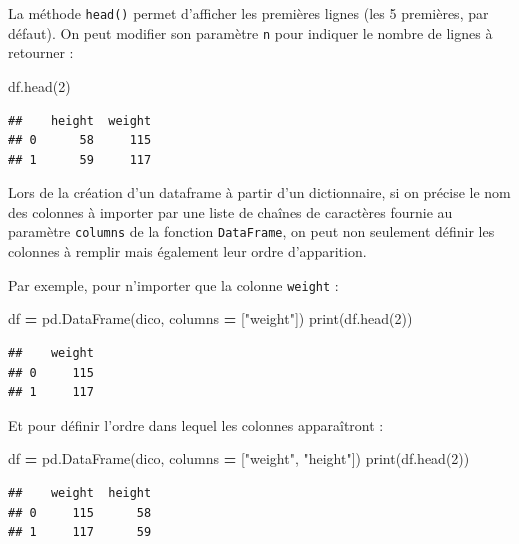 \documentclass[
  12pt,
]{book}
\newenvironment{Shaded}{\begin{snugshade}}{\end{snugshade}}
\newcommand{\BuiltInTok}[1]{#1}
\newcommand{\DecValTok}[1]{\textcolor[rgb]{0.00,0.00,0.81}{#1}}
\newcommand{\NormalTok}[1]{#1}
\newcommand{\OperatorTok}[1]{\textcolor[rgb]{0.81,0.36,0.00}{\textbf{#1}}}
\newcommand{\StringTok}[1]{\textcolor[rgb]{0.31,0.60,0.02}{#1}}
\numberwithin{equation}{section}
\numberwithin{countremarque}{section}
\begin{document}
La méthode \texttt{head()} permet d'afficher les premières lignes (les 5 premières, par défaut). On peut modifier son paramètre \texttt{n} pour indiquer le nombre de lignes à retourner :

\begin{Shaded}
\begin{Highlighting}[]
\NormalTok{df.head(}\DecValTok{2}\NormalTok{)}
\end{Highlighting}
\end{Shaded}

\begin{lstlisting}
##    height  weight
## 0      58     115
## 1      59     117
\end{lstlisting}

Lors de la création d'un dataframe à partir d'un dictionnaire, si on précise le nom des colonnes à importer par une liste de chaînes de caractères fournie au paramètre \texttt{columns} de la fonction \texttt{DataFrame}, on peut non seulement définir les colonnes à remplir mais également leur ordre d'apparition.

Par exemple, pour n'importer que la colonne \texttt{weight} :

\begin{Shaded}
\begin{Highlighting}[]
\NormalTok{df }\OperatorTok{=}\NormalTok{ pd.DataFrame(dico, columns }\OperatorTok{=}\NormalTok{ [}\StringTok{"weight"}\NormalTok{])}
\BuiltInTok{print}\NormalTok{(df.head(}\DecValTok{2}\NormalTok{))}
\end{Highlighting}
\end{Shaded}

\begin{lstlisting}
##    weight
## 0     115
## 1     117
\end{lstlisting}

Et pour définir l'ordre dans lequel les colonnes apparaîtront :

\begin{Shaded}
\begin{Highlighting}[]
\NormalTok{df }\OperatorTok{=}\NormalTok{ pd.DataFrame(dico, columns }\OperatorTok{=}\NormalTok{ [}\StringTok{"weight"}\NormalTok{, }\StringTok{"height"}\NormalTok{])}
\BuiltInTok{print}\NormalTok{(df.head(}\DecValTok{2}\NormalTok{))}
\end{Highlighting}
\end{Shaded}

\begin{lstlisting}
##    weight  height
## 0     115      58
## 1     117      59
\end{lstlisting}
\end{document}
